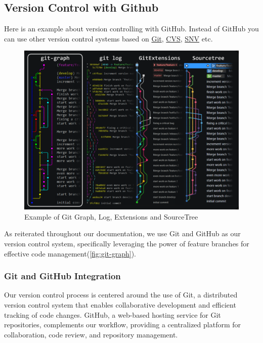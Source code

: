 \documentclass[12pt,a4paper]{article}
\begin{document}
\begin{spacing}{1.5}
    \subsection{Version Control with Github}\label{subseq:version-control}

    Here is an example about version controlling with GitHub. Instead of GitHub you
    can use other version control systems based on
    \href{https://git-scm.com/}{Git}, \href{https://www.nongnu.org/cvs/}{CVS},
    \href{https://subversion.apache.org/}{SNV} etc.

    \begin{figure}[H]
        \centering
        \includegraphics[width=16cm]{assets/git-graph-example.png}
        \caption{Example of Git Graph, Log, Extensions and SourceTree}%
        \label{fig:git-graph}%
    \end{figure}
    \FloatBarrier

    As reiterated throughout our documentation, we use Git and GitHub as our
    version control system, specifically leveraging the power of feature branches
    for effective code management(\autoref{fig:git-graph}).

    \subsubsection{Git and GitHub Integration}
    Our version control process is centered around the use of Git, a distributed
    version control system that enables collaborative development and efficient
    tracking of code changes. GitHub, a web-based hosting service for Git
    repositories, complements our workflow, providing a centralized platform for
    collaboration, code review, and repository management.


\end{spacing}
\end{document}
